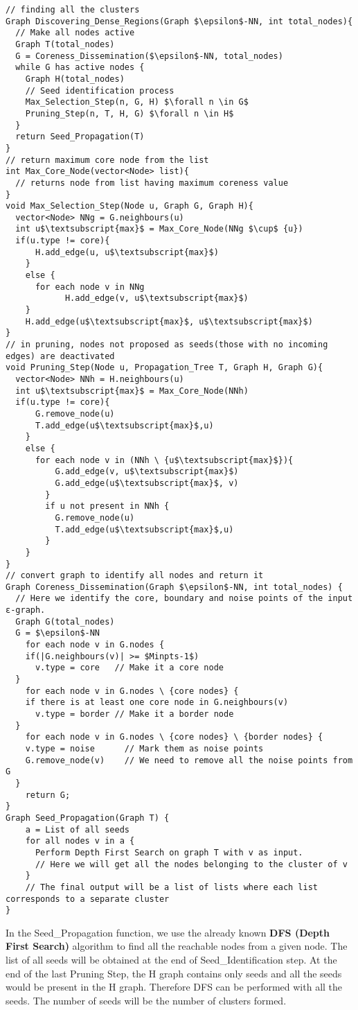 \documentclass[acmsmall]{acmart}
\begin{document}
\begin{lstlisting}
// finding all the clusters
Graph Discovering_Dense_Regions(Graph $\epsilon$-NN, int total_nodes){
  // Make all nodes active
  Graph T(total_nodes)
  G = Coreness_Dissemination($\epsilon$-NN, total_nodes)
  while G has active nodes { 
    Graph H(total_nodes) 
    // Seed identification process
    Max_Selection_Step(n, G, H) $\forall n \in G$
    Pruning_Step(n, T, H, G) $\forall n \in H$
  }
  return Seed_Propagation(T)
}
// return maximum core node from the list
int Max_Core_Node(vector<Node> list){
  // returns node from list having maximum coreness value
}
void Max_Selection_Step(Node u, Graph G, Graph H){
  vector<Node> NNg = G.neighbours(u)
  int u$\textsubscript{max}$ = Max_Core_Node(NNg $\cup$ {u})
  if(u.type != core){
      H.add_edge(u, u$\textsubscript{max}$)
    } 
    else {
      for each node v in NNg 
            H.add_edge(v, u$\textsubscript{max}$)
    }
    H.add_edge(u$\textsubscript{max}$, u$\textsubscript{max}$)
}
// in pruning, nodes not proposed as seeds(those with no incoming edges) are deactivated
void Pruning_Step(Node u, Propagation_Tree T, Graph H, Graph G){
  vector<Node> NNh = H.neighbours(u)
  int u$\textsubscript{max}$ = Max_Core_Node(NNh)
  if(u.type != core){
      G.remove_node(u)
      T.add_edge(u$\textsubscript{max}$,u)
    } 
    else {
      for each node v in (NNh \ {u$\textsubscript{max}$}){
          G.add_edge(v, u$\textsubscript{max}$)
          G.add_edge(u$\textsubscript{max}$, v)
        }
        if u not present in NNh {
          G.remove_node(u)
          T.add_edge(u$\textsubscript{max}$,u)
        }
    }
}
// convert graph to identify all nodes and return it
Graph Coreness_Dissemination(Graph $\epsilon$-NN, int total_nodes) {
  // Here we identify the core, boundary and noise points of the input ε-graph.
  Graph G(total_nodes)
  G = $\epsilon$-NN
    for each node v in G.nodes {
    if(|G.neighbours(v)| >= $Minpts-1$)
      v.type = core   // Make it a core node
  }
    for each node v in G.nodes \ {core nodes} {
    if there is at least one core node in G.neighbours(v)
      v.type = border // Make it a border node
  }
    for each node v in G.nodes \ {core nodes} \ {border nodes} {
    v.type = noise      // Mark them as noise points
    G.remove_node(v)    // We need to remove all the noise points from G
  }
    return G;
}
Graph Seed_Propagation(Graph T) {
    a = List of all seeds 
    for all nodes v in a {
      Perform Depth First Search on graph T with v as input. 
      // Here we will get all the nodes belonging to the cluster of v
    }
    // The final output will be a list of lists where each list corresponds to a separate cluster
}
\end{lstlisting}
In the Seed\_Propagation function, we use the already known \textbf{DFS (Depth First Search)} algorithm to find all the reachable nodes from a given node.
The list of all seeds will be obtained at the end of Seed\_Identification step. At the end of the last Pruning Step, the H graph contains only seeds and all the seeds would be present in the H graph.
Therefore DFS can be performed with all the seeds. The number of seeds will be the number of clusters formed. \newline
\end{document}
